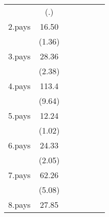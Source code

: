 {\begin{tabular}{l*{6}{c}}
                    &         (.)         &                     &                     &                     &                     &                     \\
[1em]
2.pays              &       16.50         &                     &                     &                     &                     &                     \\
                    &      (1.36)         &                     &                     &                     &                     &                     \\
[1em]
3.pays              &       28.36\sym{*}  &                     &                     &                     &                     &                     \\
                    &      (2.38)         &                     &                     &                     &                     &                     \\
[1em]
4.pays              &       113.4\sym{***}&                     &                     &                     &                     &                     \\
                    &      (9.64)         &                     &                     &                     &                     &                     \\
[1em]
5.pays              &       12.24         &                     &                     &                     &                     &                     \\
                    &      (1.02)         &                     &                     &                     &                     &                     \\
[1em]
6.pays              &       24.33\sym{*}  &                     &                     &                     &                     &                     \\
                    &      (2.05)         &                     &                     &                     &                     &                     \\
[1em]
7.pays              &       62.26\sym{***}&                     &                     &                     &                     &                     \\
                    &      (5.08)         &                     &                     &                     &                     &                     \\
[1em]
8.pays              &       27.85\sym{*}  &                     &                     &                     &                     &                     \\

\end{tabular}}
